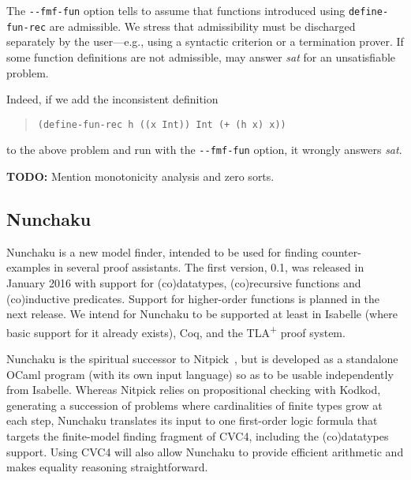 The \texttt{-}\texttt{-fmf-fun} option tells \cvc to assume that
functions introduced using \texttt{define-\allowbreak fun-\allowbreak rec} are admissible.
We stress that admissibility must be discharged separately by the user---e.g., using a
syntactic criterion or a termination prover.
If some function definitions are not admissible, \cvc may answer \emph{sat} for
an unsatisfiable problem. 
\begin{rep}
Indeed, if we add the inconsistent definition
%
\begin{quote}
\begin{verbatim}
(define-fun-rec h ((x Int)) Int (+ (h x) x))
\end{verbatim}
\end{quote}
%
to the above problem and run \cvc with the \texttt{-}\texttt{-fmf-fun} option,
it wrongly answers \emph{sat}.
\end{rep}


\textbf{TODO:} Mention monotonicity analysis and zero sorts.


\subsection{Nunchaku}
\label{ssec:nunchaku}

Nunchaku is a new model finder, intended
to be used for finding counter-examples in several proof assistants. The
first version, 0.1, was released in January 2016 with support for (co)datatypes,
(co)recursive functions and (co)inductive predicates.
Support for higher-order
functions is planned in the next release.
We intend for Nunchaku to be supported at least in Isabelle (where basic
support for it already exists), Coq, and the TLA\textsuperscript{+} proof
system.

Nunchaku is the spiritual successor to Nitpick~\cite{blanchette-nipkow-2010},
but is developed as a standalone OCaml program (with its own input language) so
as to be usable independently from Isabelle.
Whereas Nitpick relies on propositional checking with Kodkod,
generating a succession of problems where cardinalities of finite types
grow at each step, Nunchaku
translates its input to one first-order logic formula that targets
the finite-model finding fragment of CVC4, including the (co)datatypes support.
Using CVC4 will also allow Nunchaku to provide efficient arithmetic and makes
equality reasoning straightforward.

